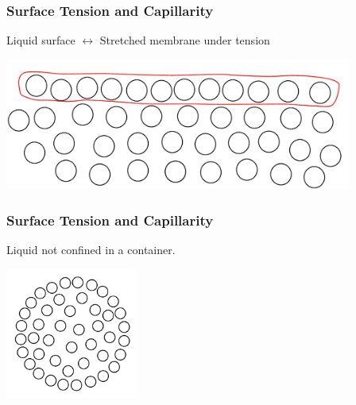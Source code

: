 \documentclass[]{beamer}
\begin{document}
\begin{frame}

\frametitle{Surface Tension and Capillarity}

Liquid surface $\leftrightarrow$ Stretched membrane under tension

  \begin{center}
  \includegraphics[height=1.7in]{images2/surfacet6.jpg}
\end{center}





 \end{frame}



\begin{frame}

\frametitle{Surface Tension and Capillarity}


Liquid not confined in a container.


  \begin{center}
  \includegraphics[height=1.7in]{images2/surfacet7.jpg}
\end{center}





 \end{frame}

\end{document}
